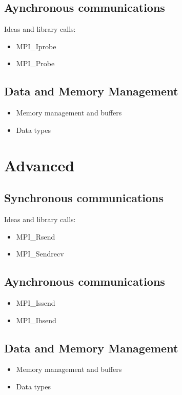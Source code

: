\subsection{Aynchronous communications}

Ideas and library calls: \\
\begin{itemize}
\item MPI_Iprobe
\item MPI_Probe
\end{itemize}

\subsection{Data and Memory Management}

\begin{itemize}
\item Memory management and buffers
\item Data types
\end{itemize}


\section{Advanced}


\subsection{Synchronous communications}

Ideas and library calls: \\
\begin{itemize}
\item MPI_Rsend
\item MPI_Sendrecv
\end{itemize}

\subsection{Aynchronous communications}

\begin{itemize}
\item MPI_Issend
\item MPI_Ibsend
\end{itemize}

\subsection{Data and Memory Management}

\begin{itemize}
\item Memory management and buffers
\item Data types
\end{itemize}


